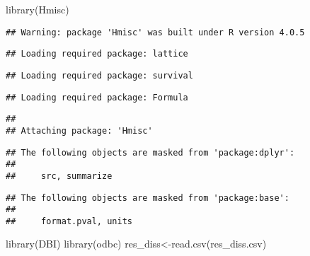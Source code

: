 \documentclass[
]{article}
\newenvironment{Shaded}{\begin{snugshade}}{\end{snugshade}}
\newcommand{\FunctionTok}[1]{\textcolor[rgb]{0.00,0.00,0.00}{#1}}
\newcommand{\NormalTok}[1]{#1}
\newcommand{\OtherTok}[1]{\textcolor[rgb]{0.56,0.35,0.01}{#1}}
\newcommand{\StringTok}[1]{\textcolor[rgb]{0.31,0.60,0.02}{#1}}
\begin{document}
\begin{Shaded}
\begin{Highlighting}[]
\FunctionTok{library}\NormalTok{(Hmisc)}
\end{Highlighting}
\end{Shaded}

\begin{verbatim}
## Warning: package 'Hmisc' was built under R version 4.0.5
\end{verbatim}

\begin{verbatim}
## Loading required package: lattice
\end{verbatim}

\begin{verbatim}
## Loading required package: survival
\end{verbatim}

\begin{verbatim}
## Loading required package: Formula
\end{verbatim}

\begin{verbatim}
## 
## Attaching package: 'Hmisc'
\end{verbatim}

\begin{verbatim}
## The following objects are masked from 'package:dplyr':
## 
##     src, summarize
\end{verbatim}

\begin{verbatim}
## The following objects are masked from 'package:base':
## 
##     format.pval, units
\end{verbatim}

\begin{Shaded}
\begin{Highlighting}[]
\FunctionTok{library}\NormalTok{(DBI)}
\FunctionTok{library}\NormalTok{(odbc)}
\NormalTok{res\_diss}\OtherTok{\textless{}{-}}\FunctionTok{read.csv}\NormalTok{(}\StringTok{\textquotesingle{}res\_diss.csv\textquotesingle{}}\NormalTok{)}
\end{Highlighting}
\end{Shaded}
\end{document}
